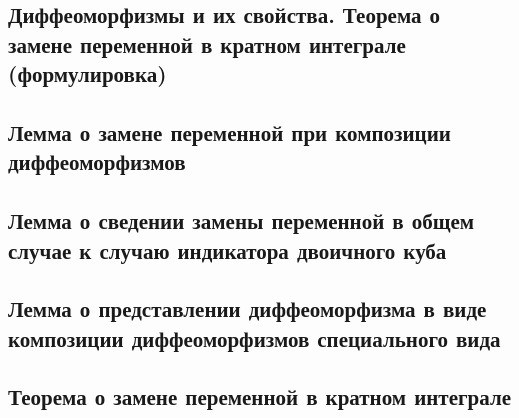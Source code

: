 \documentclass[a4paper]{article}
\theoremstyle{definition}
\theoremstyle{remark}
\begin{document}
    \subsection{ Диффеоморфизмы и их свойства. Теорема о замене переменной в кратном интеграле (формулировка)}
    \subsection{ Лемма о замене переменной при композиции диффеоморфизмов}
    \subsection{ Лемма о сведении замены переменной в общем случае к случаю индикатора двоичного куба}
    \subsection{ Лемма о представлении диффеоморфизма в виде композиции диффеоморфизмов специального вида}
    \subsection{ Теорема о замене переменной в кратном интеграле}
    
\end{document}
